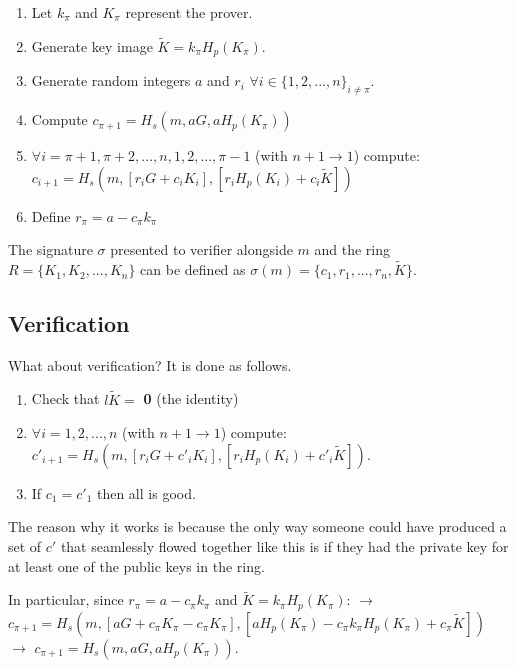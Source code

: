 \documentclass[9pt]{article}
\begin{document}
\begin{enumerate}
    \item Let $k_\pi$ and $K_\pi$ represent the prover.
    \item Generate key image $\tilde{K} = k_\pi H_p(K_\pi)$.
    \item Generate random integers $a$ and $r_i$ $\forall i \in \{1, 2, ..., n\}_{i\neq\pi}$.
    \item Compute $c_{\pi+1} = H_s(m, aG, aH_p(K_\pi))$
    \item $\forall i = \pi+1, \pi+2, ..., n, 1, 2, ..., \pi-1$ (with $n + 1 \rightarrow 1$) compute: \newline $c_{i+1} = H_s(m, [r_i G + c_i K_i], [r_i H_p(K_i) + c_i  \tilde{K}])$
    \item Define $r_\pi = a - c_\pi k_\pi$
\end{enumerate}


The signature $\sigma$ presented to verifier alongside $m$ and the ring $R = \{K_1, K_2, ..., K_n\}$ can be defined as $\sigma(m) = \{c_1, r_1, ..., r_n, \tilde{K}\}$.

\subsection{Verification}\label{math:verification}

What about verification? It is done as follows.

\begin{enumerate}
    \item Check that $l\tilde{K} =$ \textbf{0} (the identity)
    \item $\forall i = 1, 2, ..., n$ (with $n + 1 \rightarrow 1$) compute: \newline $c'_{i+1} = H_s(m, [r_i G + c'_i K_i], [r_i H_p(K_i) + c'_i \tilde{K}])$.
    \item If $c_1 = c'_1$ then all is good.
\end{enumerate}

The reason why it works is because the only way someone could have produced a set of $c'$ that seamlessly flowed together like this is if they had the private key for at least one of the public keys in the ring. 

In particular, since $r_\pi = a - c_\pi k_\pi$ and $\tilde{K} = k_\pi H_p (K_\pi)$: \newline $\rightarrow$ $c_{\pi + 1} = H_s(m, [aG + c_\pi K_\pi - c_\pi K_\pi ], [a H_p(K_\pi) - c_\pi k_\pi H_p(K_\pi) + c_\pi \tilde{K}])$ \newline $\rightarrow$ $c_{\pi + 1} =  H_s(m, aG, aH_p(K_\pi))$.
\end{document}

